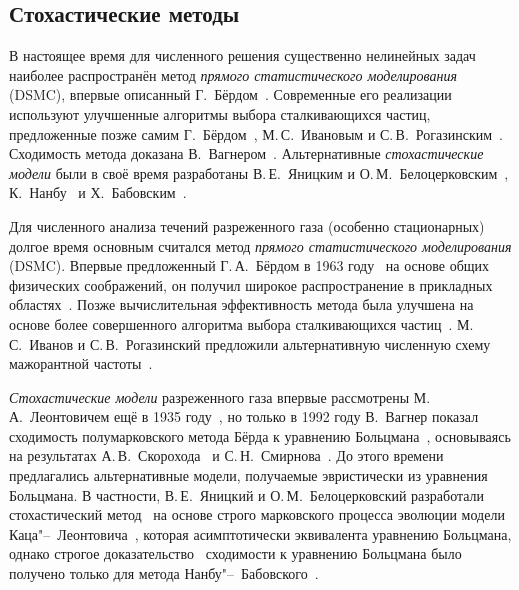 \subsection{Стохастические методы}

В настоящее время для численного решения существенно нелинейных задач наиболее распространён
метод \emph{прямого статистического моделирования} (DSMC),
впервые описанный Г.~Бёрдом~\autocite{Bird1963}.
Современные его реализации используют улучшенные алгоритмы выбора сталкивающихся частиц,
предложенные позже самим Г.~Бёрдом~\autocite{Bird1989}, М.\,С.~Ивановым и С.\,В.~Рогазинским~\autocite{Ivanov1988}.
Сходимость метода доказана В.~Вагнером~\autocite{Wagner1992}.
Альтернативные \emph{стохастические модели} были в своё время разработаны
В.\,Е.~Яницким и О.\,М.~Белоцерковским~\autocite{Yanitskij1975},
К.~Нанбу~\autocite{Nanbu1980} и Х.~Бабовским~\autocite{Babovsky1986}.



Для численного анализа течений разреженного газа (особенно стационарных) долгое время основным
считался метод \emph{прямого статистического моделирования} (DSMC).
Впервые предложенный Г.\,А.~Бёрдом в 1963 году~\cite{Bird1963} на основе общих физических соображений,
он получил широкое распространение в прикладных областях~\cite{Bird1994}.
Позже вычислительная эффективность метода была улучшена на основе более совершенного алгоритма
выбора сталкивающихся частиц~\cite{Bird1989}.
М.\,С.~Иванов и С.\,В.~Рогазинский предложили альтернативную численную схему мажорантной частоты~\cite{Ivanov1988}.

\emph{Стохастические модели} разреженного газа впервые рассмотрены М.\,А.~Леонтовичем
ещё в 1935 году~\cite{Leontovich1935}, но только в 1992 году В.~Вагнер показал сходимость
полумарковского метода Бёрда к уравнению Больцмана~\cite{Wagner1992},
основываясь на результатах А.\,В.~Скорохода~\cite{Skorokhod1983} и С.\,Н.~Смирнова~\cite{Smirnov1989}.
До этого времени предлагались альтернативные модели, получаемые эвристически из уравнения Больцмана.
В частности, В.\,Е.~Яницкий и О.\,М.~Белоцерковский разработали стохастический метод~\cite{Yanitskij1975}
на основе строго марковского процесса эволюции модели Каца"--~Леонтовича~\cite{Kac1965, Kac1973},
которая асимптотически эквивалента уравнению Больцмана, однако строгое доказательство~\cite{Babovsky1989}
сходимости к уравнению Больцмана было получено только для метода Нанбу"--~Бабовского~\cite{Nanbu1980, Babovsky1986}.

